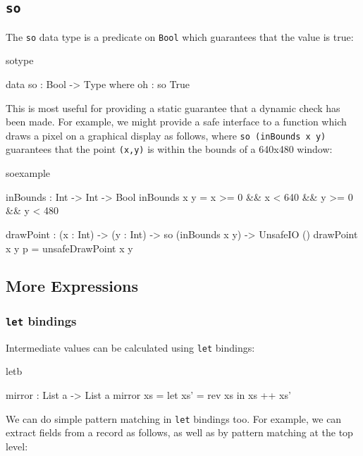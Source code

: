 \subsection{\texttt{so}}

The \texttt{so} data type is a predicate on \texttt{Bool} which guarantees that the
value is true:

\begin{SaveVerbatim}{sotype}

data so : Bool -> Type where
    oh : so True

\end{SaveVerbatim}

\noindent
This is most useful for providing a static guarantee that a dynamic check has been made.
For example, we might provide a safe interface to a function which draws a pixel
on a graphical display as follows, where \texttt{so (inBounds x y)} guarantees that 
the point \texttt{(x,y)} is within the bounds of a 640x480 window:

\begin{SaveVerbatim}{soexample}

inBounds : Int -> Int -> Bool
inBounds x y = x >= 0 && x < 640 && y >= 0 && y < 480

drawPoint : (x : Int) -> (y : Int) -> so (inBounds x y) -> UnsafeIO ()
drawPoint x y p = unsafeDrawPoint x y

\end{SaveVerbatim}

\subsection{More Expressions}

\subsubsection*{\texttt{let} bindings}

Intermediate values can be calculated using \texttt{let} bindings:

\begin{SaveVerbatim}{letb}

mirror : List a -> List a
mirror xs = let xs' = rev xs in
                xs ++ xs'

\end{SaveVerbatim}

\noindent
We can do simple pattern matching in \texttt{let} bindings too. For example, we can extract
fields from a record as follows, as well as by pattern matching at the top level:

